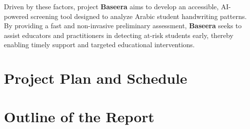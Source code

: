 Driven by these factors, project \textbf{Baseera} aims to develop an accessible, AI-powered screening tool designed to analyze Arabic student handwriting patterns. By providing a fast and non-invasive preliminary assessment, \textbf{Baseera} seeks to assist educators and practitioners in detecting at-risk students early, thereby enabling timely support and targeted educational interventions.

\section{Project Plan and Schedule}
\label{sec:plan}


\section{Outline of the Report}
\label{sec:outline}

